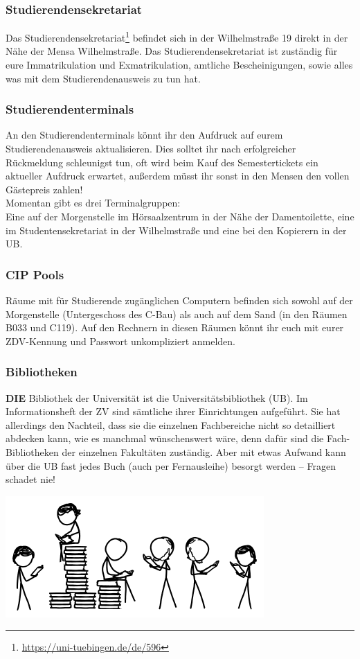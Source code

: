 \subsubsection*{Studierendensekretariat}
Das Studierendensekretariat\footnote{\url{https://uni-tuebingen.de/de/596}} befindet sich in der Wilhelmstraße 19 direkt in der Nähe der Mensa Wilhelmstraße. Das Studierendensekretariat ist zuständig für eure Immatrikulation und Exmatrikulation, amtliche Bescheinigungen, sowie alles was mit dem Studierendenausweis zu tun hat.	%

\subsubsection*{Studierendenterminals}
An den Studierendenterminals könnt ihr den Aufdruck auf eurem
Studierendenausweis aktualisieren. Dies solltet ihr nach erfolgreicher Rückmeldung schleunigst tun, oft wird beim Kauf des Semestertickets ein aktueller Aufdruck erwartet, außerdem müsst ihr sonst in den Mensen
den vollen Gästepreis zahlen!\\
Momentan gibt es drei Terminalgruppen:\\
Eine auf der Morgenstelle im Hörsaalzentrum in der Nähe der Damentoilette,
eine im Studentensekretariat in der Wilhelmstraße und eine bei den Kopierern in der UB.

\subsubsection*{CIP Pools}
Räume mit für Studierende zugänglichen Computern befinden sich sowohl auf der Morgenstelle (Untergeschoss des C-Bau) als auch auf dem Sand (in den Räumen B033 und C119). Auf den Rechnern in diesen Räumen könnt ihr euch mit eurer ZDV-Kennung und Passwort unkompliziert anmelden.

\subsubsection*{Bibliotheken}
\textbf{DIE} Bibliothek der Universität ist die
Universitätsbibliothek (UB).  Im Informationsheft der ZV sind
sämtliche ihrer Einrichtungen auf\-ge\-führt.  Sie hat
allerdings den Nachteil, dass sie die einzelnen Fachbereiche nicht so
detailliert abdecken kann, wie es manchmal wünschenswert wäre,
denn dafür sind die Fach-Bibliotheken der einzelnen Fakultäten
zuständig.  Aber mit etwas Aufwand kann über die UB fast jedes Buch
(auch per Fernausleihe) besorgt werden -- Fragen schadet nie!
\begin{center}
\includegraphics[width=0.45\hsize]{shared/xkcd/books_toomany.png}
\end{center}


